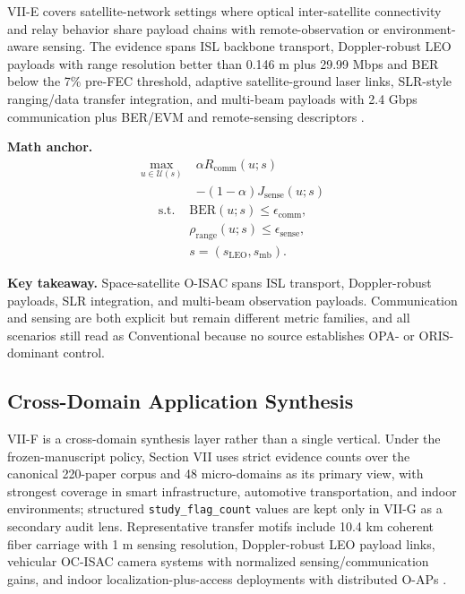 \documentclass[letterpaper,journal]{IEEEtran}
\begin{document}
VII-E covers satellite-network settings where optical inter-satellite connectivity and relay behavior share payload chains with remote-observation or environment-aware sensing. The evidence spans ISL backbone transport, Doppler-robust LEO payloads with range resolution better than 0.146 m plus 29.99 Mbps and BER below the 7\% pre-FEC threshold, adaptive satellite-ground laser links, SLR-style ranging/data transfer integration, and multi-beam payloads with 2.4 Gbps communication plus BER/EVM and remote-sensing descriptors \cite{O_ISAC_089,O_ISAC_137,O_ISAC_187,O_ISAC_195,O_ISAC_252}.

\textbf{Math anchor.}
\begin{equation}
    \begin{split}
        \max_{u\in\mathcal{U}(s)}\; & \alpha R_{\mathrm{comm}}(u;s)      \\
                                    & -(1-\alpha)J_{\mathrm{sense}}(u;s)
    \end{split}
\end{equation}
\begin{equation}
    \begin{split}
        \text{s.t. } & \mathrm{BER}(u;s)\le\epsilon_{\mathrm{comm}},           \\
                     & \rho_{\mathrm{range}}(u;s)\le\epsilon_{\mathrm{sense}}, \\
                     & s=(s_{\mathrm{LEO}},s_{\mathrm{mb}}).
    \end{split}
\end{equation}

\textbf{Key takeaway.} Space-satellite O-ISAC spans ISL transport, Doppler-robust payloads, SLR integration, and multi-beam observation payloads. Communication and sensing are both explicit but remain different metric families, and all scenarios still read as Conventional because no source establishes OPA- or ORIS-dominant control.

\subsection{Cross-Domain Application Synthesis}

VII-F is a cross-domain synthesis layer rather than a single vertical. Under the frozen-manuscript policy, Section VII uses strict evidence counts over the canonical 220-paper corpus and 48 micro-domains as its primary view, with strongest coverage in smart infrastructure, automotive transportation, and indoor environments; structured \texttt{study\_flag\_count} values are kept only in VII-G as a secondary audit lens. Representative transfer motifs include 10.4 km coherent fiber carriage with 1 m sensing resolution, Doppler-robust LEO payload links, vehicular OC-ISAC camera systems with normalized sensing/communication gains, and indoor localization-plus-access deployments with distributed O-APs \cite{O_ISAC_011,O_ISAC_074,O_ISAC_108,O_ISAC_164,O_ISAC_187}.
\end{document}
